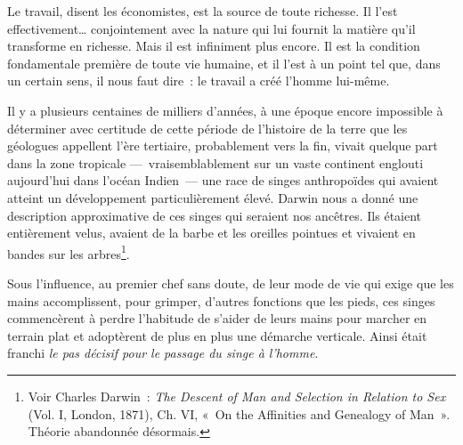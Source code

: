 \documentclass[french,twoside]{book} %
\begin{document}
\noindent Le travail, disent les économistes, est la source de toute richesse. Il l’est effectivement… conjointement avec la nature qui lui fournit la matière qu’il transforme en richesse. Mais il est infiniment plus encore. Il est la condition fondamentale première de toute vie humaine, et il l’est à un point tel que, dans un certain sens, il nous faut dire : le travail a créé l’homme lui-même.\par
Il y a plusieurs centaines de milliers d’années, à une époque encore impossible à déterminer avec certitude de cette période de l’histoire de la terre que les géologues appellent l’ère tertiaire, probablement vers la fin, vivait quelque part dans la zone tropicale — vraisemblablement sur un vaste continent englouti aujourd’hui dans l’océan Indien — une race de singes anthropoïdes qui avaient atteint un développement particulièrement élevé. Darwin nous a donné une description approximative de ces singes qui seraient nos ancêtres. Ils étaient entièrement velus, avaient de la barbe et les oreilles pointues et vivaient en bandes sur les arbres\footnote{Voir Charles Darwin : \emph{The Descent of Man and Selection in Relation to Sex} (Vol. I, London, 1871), Ch. VI, « On the Affinities and Genealogy of Man ». Théorie abandonnée désormais.}.\par
Sous l’influence, au premier chef sans doute, de leur mode de vie qui exige que les mains accomplissent, pour grimper, d’autres fonctions que les pieds, ces singes commencèrent à perdre l’habitude de s’aider de leurs mains pour marcher en terrain plat et adoptèrent de plus en plus une démarche verticale. Ainsi était franchi \emph{le pas décisif pour le passage du singe à l’homme}.\par
\end{document}
